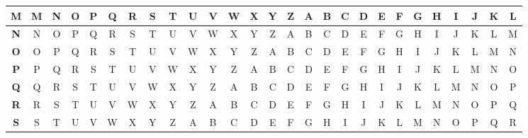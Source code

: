 \begin{table}[H]
{\begin{tabular}{c|c|c|c|c|c|c|c|c|c|c|c|c|c|c|c|c|c|c|c|c|c|c|c|c|c|c|}
            \hline
            \textbf{M} & M          & N          & O          & P          & Q          & R          & S          & T          & U          & V          & W          & X          & Y          & Z          & A          & B          & C          & D          & E          & F          & G          & H          & I          & J          & K          & L          \\[-1ex]
            \hline
            \textbf{N} & N          & O          & P          & Q          & R          & S          & T          & U          & V          & W          & X          & Y          & Z          & A          & B          & C          & D          & E          & F          & G          & H          & I          & J          & K          & L          & M          \\[-1ex]
            \hline
            \textbf{O} & O          & P          & Q          & R          & S          & T          & U          & V          & W          & X          & Y          & Z          & A          & B          & C          & D          & E          & F          & G          & H          & I          & J          & K          & L          & M          & N          \\[-1ex]
            \hline
            \textbf{P} & P          & Q          & R          & S          & T          & U          & V          & W          & X          & Y          & Z          & A          & B          & C          & D          & E          & F          & G          & H          & I          & J          & K          & L          & M          & N          & O          \\[-1ex]
            \hline
            \textbf{Q} & Q          & R          & S          & T          & U          & V          & W          & X          & Y          & Z          & A          & B          & C          & D          & E          & F          & G          & H          & I          & J          & K          & L          & M          & N          & O          & P          \\[-1ex]
            \hline
            \textbf{R} & R          & S          & T          & U          & V          & W          & X          & Y          & Z          & A          & B          & C          & D          & E          & F          & G          & H          & I          & J          & K          & L          & M          & N          & O          & P          & Q          \\[-1ex]
            \hline
            \textbf{S} & S          & T          & U          & V          & W          & X          & Y          & Z          & A          & B          & C          & D          & E          & F          & G          & H          & I          & J          & K          & L          & M          & N          & O          & P          & Q          & R          \\[-1ex]

\end{tabular}}
\end{table}
